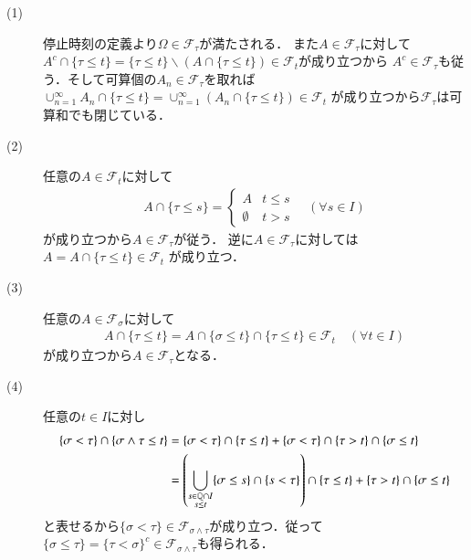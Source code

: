 	\begin{prf}\mbox{}
		\begin{description}
			\item[(1)] 停止時刻の定義より$\Omega \in \mathcal{F}_\tau$が満たされる．
				また$A \in \mathcal{F}_\tau$に対して
				$A^c \cap \{ \tau \leq t \} = \{ \tau \leq t \} \backslash \left( A \cap \{ \tau \leq t \} \right) \in \mathcal{F}_t$が成り立つから
				$A^c \in \mathcal{F}_\tau$も従う．そして可算個の$A_n \in \mathcal{F}_\tau$を取れば
				$\cup_{n=1}^{\infty} A_n \cap \{ \tau \leq t \} = \cup_{n=1}^{\infty} \left( A_n \cap \{ \tau \leq t \} \right) \in \mathcal{F}_t$
				が成り立つから$\mathcal{F}_{\tau}$は可算和でも閉じている．
			
			\item[(2)] 任意の$A \in \mathcal{F}_t$に対して
				\begin{align}
					A \cap \{ \tau \leq s \} =
					\begin{cases}
						A & t \leq s \\
						\emptyset & t > s
					\end{cases}
					\quad (\forall s \in I)
				\end{align}
				が成り立つから$A \in \mathcal{F}_\tau$が従う．
				逆に$A \in \mathcal{F}_\tau$に対しては$A = A \cap \{ \tau \leq t \} \in \mathcal{F}_t$
				が成り立つ．
				
			\item[(3)] 任意の$A \in \mathcal{F}_\sigma$に対して
				\begin{align}
					A \cap \{ \tau \leq t \} = A \cap \{ \sigma \leq t \} \cap \{ \tau \leq t \} \in \mathcal{F}_t 
					\quad (\forall t \in I)
				\end{align}
				が成り立つから$A \in \mathcal{F}_\tau$となる．
				
			\item[(4)] 任意の$t \in I$に対し
				\begin{align}
					\{\sigma < \tau\} \cap \{\sigma \wedge \tau \leq t\}
					&= \{\sigma < \tau\} \cap \{\tau \leq t\} + \{\sigma < \tau\} \cap \{\tau > t\} \cap \{\sigma \leq t\} \\
					&= \left(\bigcup_{\substack{s \in \mathbb{Q} \cap I \\ s \leq t}} \{\sigma \leq s\} \cap \{s < \tau\} \right) \cap \{\tau \leq t\} + \{\tau > t\} \cap \{\sigma \leq t\}
				\end{align}
				と表せるから$\{\sigma < \tau\} \in \mathcal{F}_{\sigma \wedge \tau}$が成り立つ．従って
				$\{\sigma \leq \tau\} = \{\tau < \sigma\}^c \in \mathcal{F}_{\sigma \wedge \tau}$も得られる．
			

\end{description}
\end{prf}
